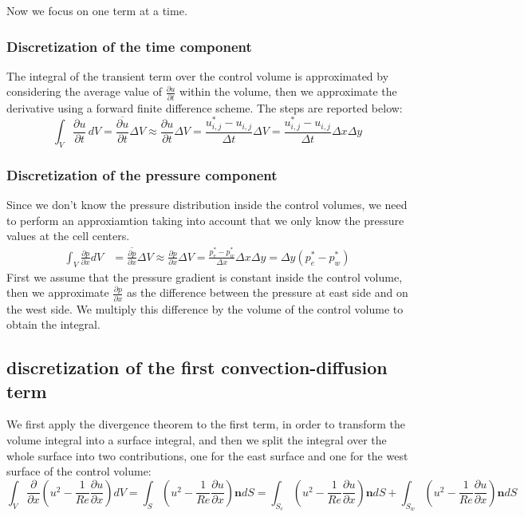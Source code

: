\documentclass{article}
\begin{document}
Now we focus on one term at a time.

\subsubsection*{Discretization of the time component}
The integral of the transient term over the control volume is approximated by considering the average value of $\frac{\partial u}{\partial t}$ within the volume, then we approximate the derivative using a forward finite difference scheme.
The steps are reported below:
\begin{equation} \label{time_discretization}
  \int_V \frac{\partial u}{\partial t} \,dV = \frac{\overline{\partial u}}{\partial t} \Delta V \approx \frac{\partial u}{\partial t} \Delta V = \frac{u_{i,j}^{*} - u_{i,j}}{\Delta t} \Delta V = \frac{u_{i,j}^{*} - u_{i,j}}{\Delta t} \Delta x \Delta y
\end{equation}

\subsubsection*{Discretization of the pressure component}
Since we don't know the pressure distribution inside the control volumes, we need to perform an approxiamtion taking into account that we only know the pressure values at the cell centers.
\begin{equation} \label{pressure_discretization}
\begin{aligned}
  \int_{V} \frac{\partial p}{\partial x} dV &= \overline{\frac{\partial p}{\partial x}} \Delta V 
  \approx \frac{\partial p}{\partial x} \Delta V 
  = \frac{p_{e}^{*} - p_{w}^{*}}{\Delta x} \Delta x \Delta y 
  = \Delta y (p_{e}^{*} - p_{w}^{*})
\end{aligned}
\end{equation}
First we assume that the pressure gradient is constant inside the control volume, then we approximate $\frac{\partial p}{\partial x}$ as the difference between the pressure at east side and on the west side. We multiply this difference by the volume of the control volume to obtain the integral.

\subsection*{discretization of the first convection-diffusion term}
We first apply the divergence theorem to the first term, in order to transform the volume integral into a surface integral, and then we split the integral over the whole surface into two contributions, one for the east surface and one for the west surface of the control volume:
\begin{equation} \label{discr_1}
  \int_{V} \frac{\partial}{\partial x} (u^2 - \frac{1}{Re} \frac{\partial u}{\partial x}) dV = \int_{S} (u^2 - \frac{1}{Re} \frac{\partial u}{\partial x}) \mathbf{n} dS = \int_{S_{e}} (u^2 - \frac{1}{Re} \frac{\partial u}{\partial x}) \mathbf{n} dS + \int_{S_{w}} (u^2 - \frac{1}{Re} \frac{\partial u}{\partial x}) \mathbf{n} dS
\end{equation}
\end{document}
